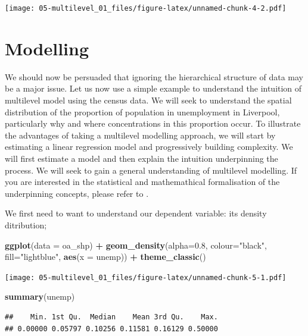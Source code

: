 \documentclass[]{book}
\newenvironment{Shaded}{\begin{snugshade}}{\end{snugshade}}
\newcommand{\KeywordTok}[1]{\textcolor[rgb]{0.13,0.29,0.53}{\textbf{#1}}}
\newcommand{\DataTypeTok}[1]{\textcolor[rgb]{0.13,0.29,0.53}{#1}}
\newcommand{\FloatTok}[1]{\textcolor[rgb]{0.00,0.00,0.81}{#1}}
\newcommand{\StringTok}[1]{\textcolor[rgb]{0.31,0.60,0.02}{#1}}
\newcommand{\OperatorTok}[1]{\textcolor[rgb]{0.81,0.36,0.00}{\textbf{#1}}}
\newcommand{\NormalTok}[1]{#1}
\begin{document}
\texttt{[image: 05-multilevel\_01\_files/figure-latex/unnamed-chunk-4-2.pdf]}

\section{Modelling}\label{modelling}

We should now be persuaded that ignoring the hierarchical structure of
data may be a major issue. Let us now use a simple example to understand
the intuition of multilevel model using the census data. We will seek to
understand the spatial distribution of the proportion of population in
unemployment in Liverpool, particularly why and where concentrations in
this proportion occur. To illustrate the advantages of taking a
multilevel modelling approach, we will start by estimating a linear
regression model and progressively building complexity. We will first
estimate a model and then explain the intuition underpinning the
process. We will seek to gain a general understanding of multilevel
modelling. If you are interested in the statistical and mathemathical
formalisation of the underpinning concepts, please refer to
\citet{Gelman_Hill_2006_book}.

We first need to want to understand our dependent variable: its density
ditribution;

\begin{Shaded}
\begin{Highlighting}[]
\KeywordTok{ggplot}\NormalTok{(}\DataTypeTok{data =}\NormalTok{ oa_shp) }\OperatorTok{+}
\KeywordTok{geom_density}\NormalTok{(}\DataTypeTok{alpha=}\FloatTok{0.8}\NormalTok{, }\DataTypeTok{colour=}\StringTok{"black"}\NormalTok{, }\DataTypeTok{fill=}\StringTok{"lightblue"}\NormalTok{, }\KeywordTok{aes}\NormalTok{(}\DataTypeTok{x =}\NormalTok{ unemp)) }\OperatorTok{+}
\StringTok{   }\KeywordTok{theme_classic}\NormalTok{()}
\end{Highlighting}
\end{Shaded}

\texttt{[image: 05-multilevel\_01\_files/figure-latex/unnamed-chunk-5-1.pdf]}

\begin{Shaded}
\begin{Highlighting}[]
\KeywordTok{summary}\NormalTok{(unemp)}
\end{Highlighting}
\end{Shaded}

\begin{verbatim}
##    Min. 1st Qu.  Median    Mean 3rd Qu.    Max. 
## 0.00000 0.05797 0.10256 0.11581 0.16129 0.50000
\end{verbatim}
\end{document}
